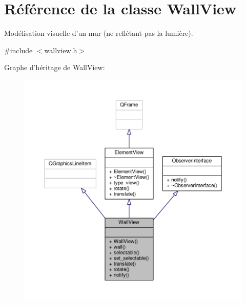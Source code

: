 \hypertarget{classWallView}{\section{Référence de la classe Wall\+View}
\label{classWallView}
}


Modélisation visuelle d’un mur (ne reflétant pas la lumière).  




{\ttfamily \#include $<$wallview.\+h$>$}



Graphe d'héritage de Wall\+View\+:
\nopagebreak
\begin{figure}[H]
\begin{center}
\leavevmode
\includegraphics[width=350pt]{dd/dc1/classWallView__inherit__graph}
\end{center}
\end{figure}


